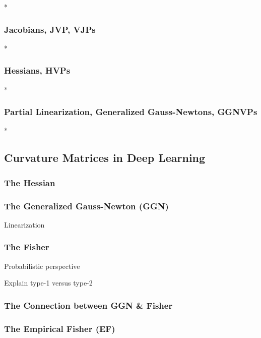 \switchcolumn[0]*
\subsubsection{Jacobians, JVP, VJPs}


\switchcolumn[0]*
\subsubsection{Hessians, HVPs}


\switchcolumn[0]*
\subsubsection{Partial Linearization, Generalized Gauss-Newtons, GGNVPs}


\switchcolumn[0]*
\subsection{Curvature Matrices in Deep Learning}
\subsubsection{The Hessian}

\subsubsection{The Generalized Gauss-Newton (GGN)}
Linearization

\subsubsection{The Fisher}
Probabilistic perspective

Explain type-1 versus type-2
\subsubsection{The Connection between GGN \& Fisher}
\subsubsection{The Empirical Fisher (EF)}

